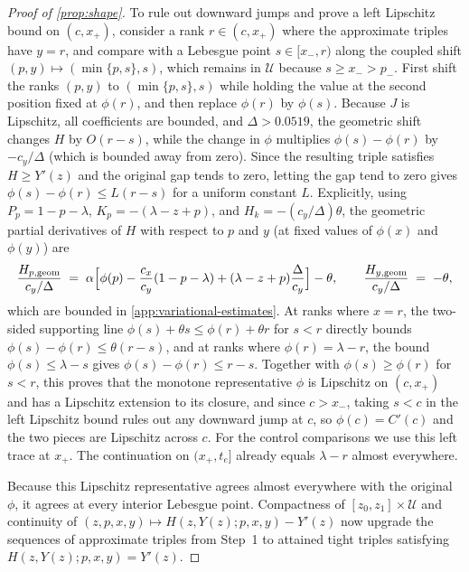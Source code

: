 \documentclass[11pt]{article}
\numberwithin{equation}{section}
\theoremstyle{plain}
\theoremstyle{definition}
\newcommand{\1}{\mathbf{1}}
\newcommand{\calU}{\mathcal{U}}
\begin{document}
\begin{proof}[Proof of {\cref{prop:shape}}]
To rule out downward jumps and prove a left Lipschitz bound on $(c, x_+)$, consider a rank $r \in (c, x_+)$ where the approximate triples have $y = r$, and compare with a Lebesgue point $s \in [x_-, r)$ along the coupled shift $(p, y) \mapsto (\min\{p, s\}, s)$, which remains in $\calU$ because $s \ge x_- > p_-$. First shift the ranks $(p, y)$ to $(\min\{p, s\}, s)$ while holding the value at the second position fixed at $\phi(r)$, and then replace $\phi(r)$ by $\phi(s)$. Because $J$ is Lipschitz, all coefficients are bounded, and $\Delta > 0.0519$, the geometric shift changes $H$ by $O(r - s)$, while the change in $\phi$ multiplies $\phi(s) - \phi(r)$ by $-c_y/\Delta$ (which is bounded away from zero). Since the resulting triple satisfies $H \ge Y'(z)$ and the original gap tends to zero, letting the gap tend to zero gives $\phi(s) - \phi(r) \le L(r - s)$ for a uniform constant $L$. Explicitly, using $P_p = 1 - p - \lambda$, $K_p = -(\lambda - z + p)$, and $H_k = -(c_y/\Delta)\theta$, the geometric partial derivatives of $H$ with respect to $p$ and $y$ (at fixed values of $\phi(x)$ and $\phi(y)$) are
\begin{equation}
  \frac{H_{p, \mathrm{geom}}}{c_y/\Delta} \;=\; \alpha\Bigl[\phi(p) - \frac{c_x}{c_y}(1 - p - \lambda) + (\lambda - z + p)\frac{\Delta}{c_y}\Bigr] - \theta,
  \qquad
  \frac{H_{y, \mathrm{geom}}}{c_y/\Delta} \;=\; -\theta,
  \label{eq:mass-geometric-derivative}
\end{equation}
which are bounded in \cref{app:variational-estimates}. At ranks where $x = r$, the two-sided supporting line $\phi(s) + \theta s \le \phi(r) + \theta r$ for $s < r$ directly bounds $\phi(s) - \phi(r) \le \theta(r - s)$, and at ranks where $\phi(r) = \lambda - r$, the bound $\phi(s) \le \lambda - s$ gives $\phi(s) - \phi(r) \le r - s$. Together with $\phi(s) \ge \phi(r)$ for $s < r$, this proves that the monotone representative $\phi$ is Lipschitz on $(c,x_+)$ and has a Lipschitz extension to its closure, and since $c > x_-$, taking $s < c$ in the left Lipschitz bound rules out any downward jump at $c$, so $\phi(c) = C'(c)$ and the two pieces are Lipschitz across $c$. For the control comparisons we use this left trace at $x_+$. The continuation on $(x_+,t_e]$ already equals $\lambda-r$ almost everywhere.

Because this Lipschitz representative agrees almost everywhere with the original $\phi$, it agrees at every interior Lebesgue point. Compactness of $[z_0, z_1] \times \calU$ and continuity of $(z, p, x, y) \mapsto H(z, Y(z); p, x, y) - Y'(z)$ now upgrade the sequences of approximate triples from Step~1 to attained tight triples satisfying $H(z, Y(z); p, x, y) = Y'(z)$.


\end{proof}
\end{document}
